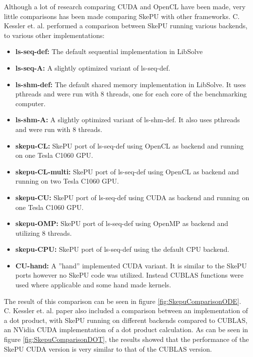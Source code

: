 Although a lot of research comparing CUDA and OpenCL have been made, very little comparisons has been made comparing SkePU with other frameworks. C. Kessler et. al. performed a comparison between SkePU running various backends, to various other implementations: \cite{enmyren2010skepu}
\begin{itemize}
    \item \textbf{ls-seq-def:} The default sequential implementation in LibSolve
    \item \textbf{ls-seq-A:} A slightly optimized variant of ls-seq-def.
    \item \textbf{ls-shm-def:} The default shared memory implementation in LibSolve. It uses pthreads and were run with 8 threads, one for each core of the benchmarking computer.
    \item \textbf{ls-shm-A:} A slightly optimized variant of ls-shm-def. It also uses pthreads and were run with 8 threads.
    \item \textbf{skepu-CL:} SkePU port of ls-seq-def using OpenCL as backend and running on one Tesla C1060 GPU.
    \item \textbf{skepu-CL-multi:} SkePU port of ls-seq-def using OpenCL as backend and running on two Tesla C1060 GPU.
    \item \textbf{skepu-CU:} SkePU port of ls-seq-def using CUDA as backend and running on one Tesla C1060 GPU.
    \item \textbf{skepu-OMP:} SkePU port of ls-seq-def using OpenMP as backend and utilizing 8 threads. 
    \item \textbf{skepu-CPU:} SkePU port of ls-seq-def using the default CPU backend.
    \item \textbf{CU-hand:} A ”hand” implemented CUDA variant. It is similar to the SkePU ports however no SkePU code was utilized. Instead CUBLAS functions were used where applicable and some hand made kernels.

\end{itemize}
\noindent The result of this comparison can be seen in figure \ref{fig:SkepuComparisonODE}. 
C. Kessler et. al. paper also included a comparison between an implementation of a dot product, with SkePU running on different backends compared to CUBLAS, an NVidia CUDA implementation of a dot product calculation. As can be seen in figure \ref{fig:SkepuComparisonDOT}, the results showed that the performance of the SkePU CUDA version is very similar to that of the CUBLAS version.

